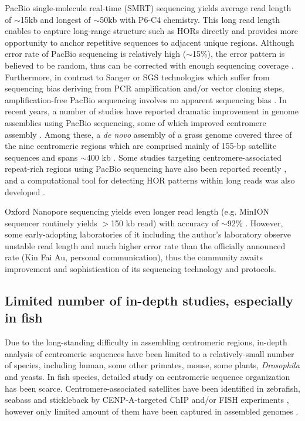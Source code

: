   PacBio single-molecule real-time (SMRT) sequencing yields average read length of $\sim$15kb and longest of $\sim$50kb with P6-C4 chemistry. This long read length enables to capture long-range structure such as HORs directly and provides more opportunity to anchor repetitive sequences to adjacent unique regions. Although error rate of PacBio sequencing is relatively high ($\sim$15\%), the error pattern is believed to be random, thus can be corrected with enough sequencing coverage \cite{Myers2014}. Furthermore, in contrast to Sanger or SGS technologies which suffer from sequencing bias deriving from PCR amplification and/or vector cloning steps, amplification-free PacBio sequencing involves no apparent sequencing bias \cite{Ross2013}. In recent years, a number of studies have reported dramatic improvement in genome assemblies using PacBio sequencing, some of which improved centromere assembly \cite{VanBuren2015, Vij2016, Jiao2016}. Among these, a \textit{de novo} assembly of a grass genome covered three of the nine centromeric regions which are comprised mainly of 155-bp satellite sequences and spans $\sim$400 kb \cite{VanBuren2015}. Some studies targeting centromere-associated repeat-rich regions using PacBio sequencing have also been reported recently \cite{Wolfgruber2016, Khost2016}, and a computational tool for detecting HOR patterns within long reads was also developed \cite{Sevim2016}.

  Oxford Nanopore sequencing yields even longer read length (e.g. MinION sequencer routinely yields $>$150 kb read) with accuracy of $\sim$92\% \cite{Jain2016}. However, some early-adopting laboratories of it including the author's laboratory observe unstable read length and much higher error rate than the officially announced rate (Kin Fai Au, personal communication), thus the community awaits improvement and sophistication of its sequencing technology and protocols.


\subsection*{Limited number of in-depth studies, especially in fish}
  Due to the long-standing difficulty in assembling centromeric regions, in-depth analysis of centromeric sequences have been limited to a relatively-small number of species, including human, some other primates, mouse, some plants, \textit{Drosophila} and yeasts\cite{Plohl2014}. In fish species, detailed study on centromeric sequence organization has been scarce. Centromere-associated satellites have been identified in zebrafish, seabass and stickleback by CENP-A-targeted ChIP and/or FISH experiments \cite{Phillips2000, Kuznetsova2014, Cech2015}, however only limited amount of them have been captured in assembled genomes \cite{Howe2013, Vij2016, Cech2015}.

